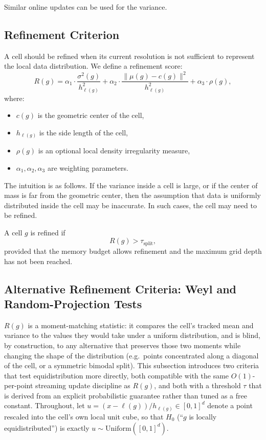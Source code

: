 \documentclass[11pt]{article}
\begin{document}
Similar online updates can be used for the variance.

\subsection{Refinement Criterion}
\label{sec:proposed-method-refinement}

A cell should be refined when its current resolution is not sufficient to represent the local data distribution. We define a refinement score:
\[
R(g) =
\alpha_1 \cdot \frac{\sigma^2(g)}{h_{\ell(g)}^2}
+
\alpha_2 \cdot
\frac{\|\mu(g) - c(g)\|^2}{h_{\ell(g)}^2}
+
\alpha_3 \cdot \rho(g),
\]
where:

\begin{itemize}
    \item $c(g)$ is the geometric center of the cell,
    \item $h_{\ell(g)}$ is the side length of the cell,
    \item $\rho(g)$ is an optional local density irregularity measure,
    \item $\alpha_1,\alpha_2,\alpha_3$ are weighting parameters.
\end{itemize}

The intuition is as follows. If the variance inside a cell is large, or if the center of mass is far from the geometric center, then the assumption that data is uniformly distributed inside the cell may be inaccurate. In such cases, the cell may need to be refined.

A cell $g$ is refined if
\[
R(g) > \tau_{\text{split}},
\]
provided that the memory budget allows refinement and the maximum grid depth has not been reached.

\subsection{Alternative Refinement Criteria: Weyl and Random-Projection Tests}
\label{sec:alt-criteria}

$R(g)$ is a moment-matching statistic: it compares the cell's tracked mean and variance to the values they would take under a uniform distribution, and is blind, by construction, to any alternative that preserves those two moments while changing the shape of the distribution (e.g.\ points concentrated along a diagonal of the cell, or a symmetric bimodal split). This subsection introduces two criteria that test equidistribution more directly, both compatible with the same $O(1)$-per-point streaming update discipline as $R(g)$, and both with a threshold $\tau$ that is derived from an explicit probabilistic guarantee rather than tuned as a free constant. Throughout, let $u = (x - \ell(g))/h_{\ell(g)} \in [0,1]^d$ denote a point rescaled into the cell's own local unit cube, so that $H_0$ (``$g$ is locally equidistributed'') is exactly $u \sim \mathrm{Uniform}([0,1]^d)$.
\end{document}
